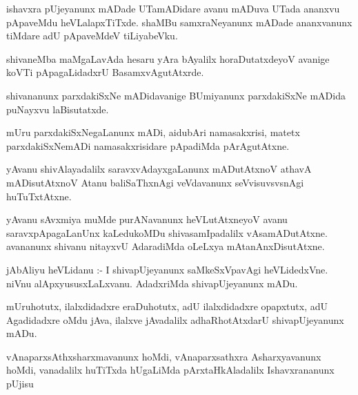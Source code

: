 \documentclass{article}
\begin{document}
\begin{mn}
ishavxra  pUjeyanunx  mADade  UTamADidare  avanu  mADuva  UTada  ananxvu  pApaveMdu  heVLalapxTiTxde.  
shaMBu  samxraNeyanunx  mADade  ananxvanunx  tiMdare  adU  pApaveMdeV  tiLiyabeVku.
\end{mn}

\begin{mn}
shivaneMba  maMgaLavAda  hesaru  yAra  bAyalilx  horaDutatxdeyoV  avanige  koVTi  pApagaLidadxrU  BasamxvAgutAtxrde.
\end{mn}

\begin{mn}
shivananunx  parxdakiSxNe  mADidavanige  BUmiyanunx  parxdakiSxNe  mADida  puNayxvu  laBisutatxde.
\end{mn}

\begin{mn}
mUru  parxdakiSxNegaLanunx  mADi,  aidubAri  namasakxrisi,  matetx  parxdakiSxNemADi  namasakxrisidare  
pApadiMda  pArAgutAtxne.
\end{mn}

\begin{mn}
yAvanu  shivAlayadalilx  saravxvAdayxgaLanunx  mADutAtxnoV  athavA  mADisutAtxnoV  Atanu  baliSaThxnAgi  
veVdavanunx  seVvisuvsvsnAgi  huTuTxtAtxne.
\end{mn}

\begin{mn}
yAvanu  sAvxmiya  muMde  purANavanunx  heVLutAtxneyoV  avanu  saravxpApagaLanUnx  kaLedukoMDu  shivasamIpadalilx  
vAsamADutAtxne.  avananunx  shivanu  nitayxvU  AdaradiMda  oLeLxya  mAtanAnxDisutAtxne.
\end{mn}

\begin{mn}
jAbAliyu  heVLidanu :- I  shivapUjeyanunx  saMkeSxVpavAgi  heVLidedxVne.  niVnu  alApxyususxLaLxvanu.  
AdadxriMda  shivapUjeyanunx  mADu.
\end{mn}

\begin{mn}
mUruhotutx,  ilalxdidadxre  eraDuhotutx,  adU  ilalxdidadxre  opapxtutx,  adU  Agadidadxre  oMdu  
jAva,  ilalxve  jAvadalilx  adhaRhotAtxdarU  shivapUjeyanunx  mADu.
\end{mn}

\begin{mn}
vAnaparxsAthxsharxmavanunx  hoMdi,  vAnaparxsathxra  Asharxyavanunx  hoMdi,  vanadalilx  huTiTxda  
hUgaLiMda  pArxtaHkAladalilx  Ishavxrananunx  pUjisu
\end{mn}
\end{document}
